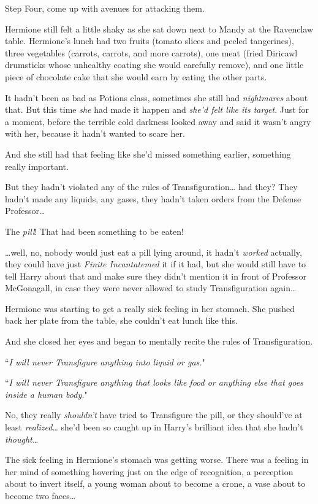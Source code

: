 Step Four, come up with avenues for attacking them.

\later

Hermione still felt a little shaky as she sat down next to Mandy at the Ravenclaw table. Hermione's lunch had two fruits (tomato slices and peeled tangerines), three vegetables (carrots, carrots, and more carrots), one meat (fried Diricawl drumsticks whose unhealthy coating she would carefully remove), and one little piece of chocolate cake that she would earn by eating the other parts.

It hadn't been as bad as Potions class, sometimes she still had \emph{nightmares} about that. But this time \emph{she} had made it happen and \emph{she'd felt like its target}. Just for a moment, before the terrible cold darkness looked away and said it wasn't angry with her, because it hadn't wanted to scare her.

And she still had that feeling like she'd missed something earlier, something really important.

But they hadn't violated any of the rules of Transfiguration{\ldots} had they? They hadn't made any liquids, any gases, they hadn't taken orders from the Defense Professor{\ldots}

The \emph{pill}! That had been something to be eaten!

{\ldots}well, no, nobody would just eat a pill lying around, it hadn't \emph{worked} actually, they could have just \emph{Finite Incantatemed} it if it had, but she would still have to tell Harry about that and make sure they didn't mention it in front of Professor McGonagall, in case they were never allowed to study Transfiguration again{\ldots}

Hermione was starting to get a really sick feeling in her stomach. She pushed back her plate from the table, she couldn't eat lunch like this.

And she closed her eyes and began to mentally recite the rules of Transfiguration.

``\emph{I will never Transfigure anything into liquid or gas.}"

``\emph{I will never Transfigure anything that looks like food or anything else that goes inside a human body.}"

No, they really \emph{shouldn't} have tried to Transfigure the pill, or they should've at least \emph{realized{\ldots}} she'd been so caught up in Harry's brilliant idea that she hadn't \emph{thought{\ldots}}

The sick feeling in Hermione's stomach was getting worse. There was a feeling in her mind of something hovering just on the edge of recognition, a perception about to invert itself, a young woman about to become a crone, a vase about to become two faces{\ldots}

